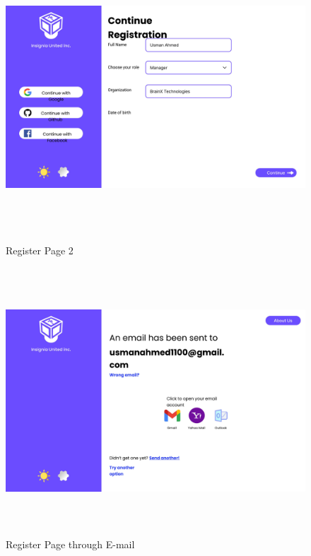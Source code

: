 \begin{figure}[H]
\includegraphics[height=10cm, width=1\textwidth]{./images/prototype/0015}
\centering 
\caption{Register Page 2}
\label{fig:prototype1}

\includegraphics[height=10cm, width=1\textwidth]{./images/prototype/0007}
\centering 
\caption{Register Page through E-mail}
\label{fig:prototype1}
\end{figure}

